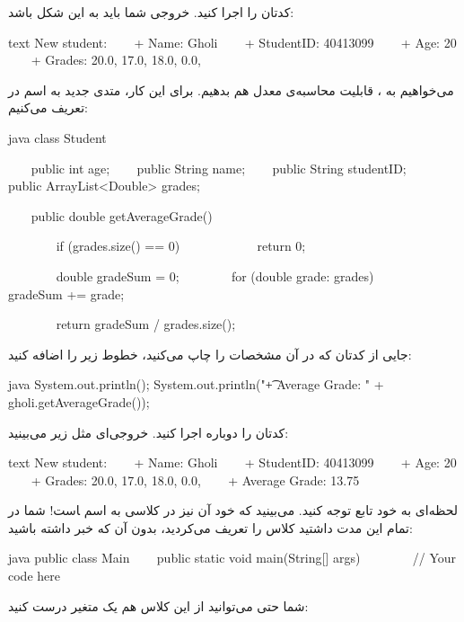 کدتان را اجرا کنید. خروجی شما باید به این شکل باشد:

\begin{codebox}{text}
New student:  
    + Name: Gholi  
    + StudentID: 40413099  
    + Age: 20  
    + Grades: 20.0, 17.0, 18.0, 0.0,
\end{codebox}

می‌خواهیم به  ، قابلیت محاسبه‌ی معدل هم بدهیم. برای
این کار، متدی جدید به اسم  در
 تعریف می‌کنیم:

\begin{codebox}{java}
class Student {
    public int age;
    public String name;
    public String studentID;
    public ArrayList<Double> grades;

    public double getAverageGrade() { 
        if (grades.size() == 0) {
            return 0;  
        }

        double gradeSum = 0;
        for (double grade: grades) {  
            gradeSum += grade;  
        }

        return gradeSum / grades.size();  
    }  
}
\end{codebox}

جایی از کدتان که در آن مشخصات  را چاپ می‌کنید، خطوط
زیر را اضافه کنید:

\begin{codebox}{java}
System.out.println();  
System.out.println("\t+ Average Grade: " + gholi.getAverageGrade());
\end{codebox}

کدتان را دوباره اجرا کنید. خروجی‌ای مثل زیر می‌بینید:

\begin{codebox}{text}
New student:  
    + Name: Gholi  
    + StudentID: 40413099  
    + Age: 20  
    + Grades: 20.0, 17.0, 18.0, 0.0,   
    + Average Grade: 13.75
\end{codebox}

لحظه‌ای به خود تابع  توجه کنید. می‌بینید که خود آن نیز
در کلاسی به اسم ‍است! شما در تمام این مدت داشتید کلاس
 را تعریف می‌کردید، بدون آن که خبر داشته باشید:

\begin{codebox}{java}
public class Main {
    public static void main(String[] args) {
        // Your code here
    }  
}
\end{codebox}

شما حتی می‌توانید از این کلاس هم یک متغیر درست کنید:

